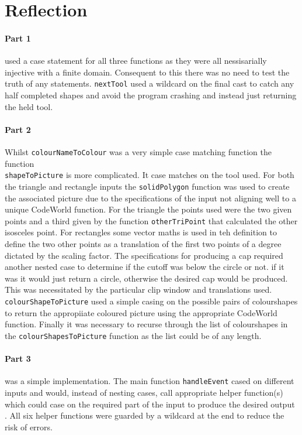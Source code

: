\documentclass[11pt]{article}
\begin{document}
\section{Reflection}
\paragraph{Part 1} used a case statement for all three functions as they were all nessisarially injective with a finite domain. Consequent to this there was no need to test the truth of any statements. \verb|nextTool| used a wildcard on the final cast to catch any half completed shapes and avoid the program crashing and instead just returning the held tool.
\paragraph{Part 2} Whilst \verb|colourNameToColour| was a very simple case matching function the function\\ \verb|shapeToPicture| is more complicated. It case matches on the tool used. For both the triangle and rectangle inputs the \verb|solidPolygon| function was used to create the associated picture due to the specifications of the input not aligning well to a unique CodeWorld  function. For the triangle the points used were the two given points and a third given by the function \verb|otherTriPoint| that calculated the other isosceles point. For rectangles some vector maths is used in teh definition to define the two other points as a translation of the first two points of a degree dictated by the scaling factor. The specifications for producing a cap required another nested case to determine if the cutoff was below the circle or not. if it was it would just return a circle, otherwise the desired cap would be produced. This was necessitated by the particular clip window and translations used. \verb|colourShapeToPicture| used a simple casing on the possible pairs of colourshapes to return the appropiiate coloured picture using the appropriate CodeWorld function. Finally it was necessary to recurse through the list of colourshapes in the \verb|colourShapesToPicture| function as the list could be of any length.
\paragraph{Part 3} was a simple implementation. The main function \verb|handleEvent| cased on different inputs and would, instead of nesting cases, call appropriate helper function(s) which could case on the required part of the input to produce the desired output .  All six helper functions were guarded by a wildcard at the end to reduce the risk of errors.
\end{document}

